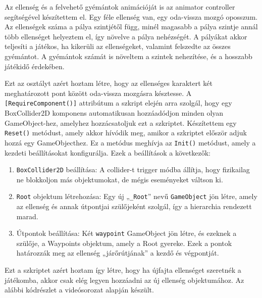 \newpage
{}

Az ellenség és a felvehető gyémántok animációját is az animator controller segítségével készítettem el. Egy féle ellenség van, egy oda-vissza mozgó oposszum. Az ellenségek száma a pálya szintjétől függ, minél magasabb a pálya szintje annál több ellenséget helyeztem el, így növelve a pálya nehézségét. A pályákat akkor teljesíti a játékos, ha kikerüli az ellenségeket, valamint felszedte az összes gyémántot. A gyémántok számát is növeltem a szintek nehezítése, és a hosszabb játékidő érdekében.


Ezt az osztályt azért hoztam létre, hogy az ellenséges karaktert két meghatározott pont között oda-vissza mozgásra késztesse. A \texttt{[RequireComponent()]} attribútum a szkript elején arra szolgál, hogy egy BoxCollider2D komponens automatikusan hozzáadódjon minden olyan  GameObject-hez, amelyhez hozzácsatoljuk ezt a szkriptet. Készítettem egy \texttt{Reset()} metódust, amely akkor hívódik meg, amikor a szkriptet először adjuk hozzá egy GameObjecthez. Ez a metódus meghívja az \texttt{Init()} metódust, amely a kezdeti beállításokat konfigurálja. Ezek a beállítások a következők:
\begin{enumerate}
\item \texttt{BoxCollider2D} beállítása: A collider-t trigger módba állítja, hogy fizikailag ne blokkoljon más objektumokat, de mégis eseményeket váltson ki.
\item \texttt{Root} objektum létrehozása: Egy új „\texttt{\_Root}” nevű \texttt{GameObject} jön létre, amely az ellenség és annak útpontjai szülőjeként szolgál, így a hierarchia rendezett marad.
\item Útpontok beállítása: Két \texttt{waypoint} GameObject jön létre, és ezeknek a szülője, a Waypoints objektum, amely a Root gyereke. Ezek a pontok határozzák meg az ellenség „járőrútjának” a kezdő és végpontját.
\end{enumerate}

Ezt a szkriptet azért hoztam így létre, hogy ha újfajta ellenséget szeretnék a játékomba, akkor csak elég legyen hozzáadni az új ellenség objektumához. Az alábbi kódrészlet a \cite{youtubeplaylist} videósorozat alapján készült.

